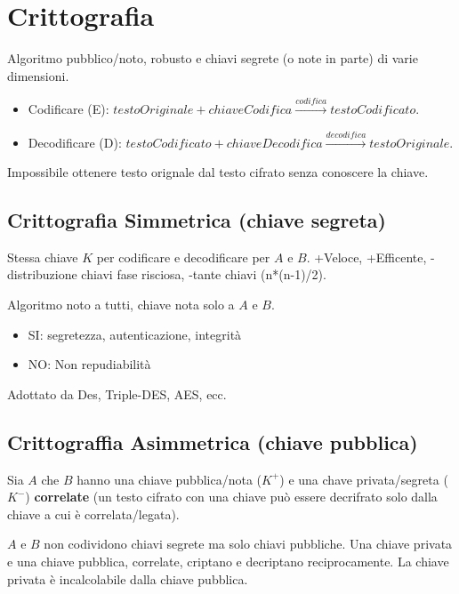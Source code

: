 \section{Crittografia}
Algoritmo pubblico/noto, robusto e chiavi segrete (o note in parte) di varie dimensioni.
\begin{itemize}
	\item Codificare (E): $testoOriginale + chiaveCodifica \stackrel{codifica}{\longrightarrow} testoCodificato$.
	\item Decodificare (D): $testoCodificato + chiaveDecodifica \stackrel{decodifica}{\longrightarrow} testoOriginale$.
\end{itemize}
Impossibile ottenere testo orignale dal testo cifrato senza conoscere la chiave.

\subsection{Crittografia Simmetrica (chiave segreta)}
Stessa chiave $K$ per codificare e decodificare per $A$ e $B$.
+Veloce, +Efficente, -distribuzione chiavi fase risciosa, -tante chiavi (n*(n-1)/2).
\begin{center}
\end{center}
Algoritmo noto a tutti, chiave nota solo a $A$ e $B$.
\begin{itemize}
	\item SI: segretezza, autenticazione, integrità
	\item NO: Non repudiabilità
\end{itemize}
Adottato da Des, Triple-DES, AES, ecc.

\subsection{Crittograffia Asimmetrica (chiave pubblica)}
Sia $A$ che $B$ hanno una chiave pubblica/nota ($K^+$) e una chave privata/segreta ($K^-$) \textbf{correlate} (un testo cifrato con una chiave può essere decrifrato solo dalla chiave a cui è correlata/legata).

$A$ e $B$ non codividono chiavi segrete ma solo chiavi pubbliche.
Una chiave privata e una chiave pubblica, correlate, criptano e decriptano reciprocamente. La chiave privata è incalcolabile dalla chiave pubblica.

